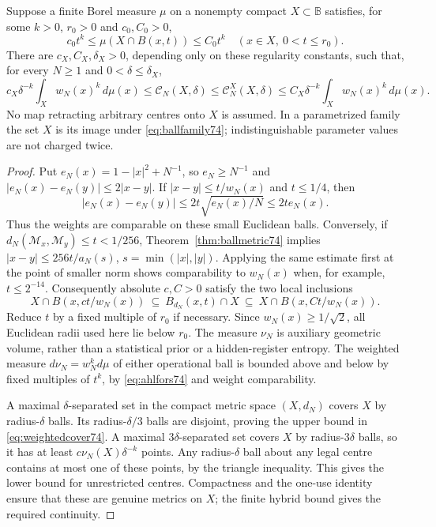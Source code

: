 \begin{theorem}\label{thm:weightedcover74}
Suppose a finite Borel measure $\mu$ on a nonempty compact
$X\subset\mathbb B$ satisfies, for some $k>0$, $r_0>0$ and $c_0,C_0>0$,
\begin{equation}\label{eq:ahlfors74}
 c_0 t^k\le\mu(X\cap B(x,t))\le C_0t^k
           \quad(x\in X,\ 0<t\le r_0).
\end{equation}
There are $c_X,C_X,\delta_X>0$, depending only on these regularity
constants, such that, for every $N\ge1$ and $0<\delta\le\delta_X$,
\begin{equation}\label{eq:weightedcover74}
 c_X\delta^{-k}\int_X w_N(x)^k\,d\mu(x)
 \le\mathcal C_N(X,\delta)
 \le\mathcal C_N^X(X,\delta)
 \le C_X\delta^{-k}\int_X w_N(x)^k\,d\mu(x).
\end{equation}
No map retracting arbitrary centres onto $X$ is assumed. In a
parametrized family the set $X$ is its image under \eqref{eq:ballfamily74};
indistinguishable parameter values are not charged twice.
\end{theorem}
\begin{proof}
Put $e_N(x)=1-|x|^2+N^{-1}$, so $e_N\ge N^{-1}$ and
$|e_N(x)-e_N(y)|\le2|x-y|$. If
$|x-y|\le t/w_N(x)$ and $t\le1/4$, then
\[
 |e_N(x)-e_N(y)|\le2t\sqrt{e_N(x)/N}\le2t e_N(x).
\]
Thus the weights are comparable on these small Euclidean balls.
Conversely, if $d_N(\mathcal M_x,\mathcal M_y)\le t<1/256$,
Theorem~\ref{thm:ballmetric74} implies
$|x-y|\le256t/a_N(s)$, $s=\min(|x|,|y|)$. Applying the same estimate
first at the point of smaller norm shows comparability to $w_N(x)$
when, for example, $t\le2^{-14}$. Consequently absolute $c,C>0$
satisfy the two local inclusions
\[
 X\cap B(x,ct/w_N(x))\ \subseteq\ B_{d_N}(x,t)\cap X
 \ \subseteq\ X\cap B(x,Ct/w_N(x)).
\]
Reduce $t$ by a fixed multiple of $r_0$ if necessary. Since
$w_N(x)\ge1/\sqrt2$, all Euclidean radii used here lie below $r_0$.
The measure $\nu_N$ is auxiliary geometric volume, rather than a
statistical prior or a hidden-register entropy. The weighted measure
$d\nu_N=w_N^k d\mu$ of either operational ball
is bounded above and below by fixed multiples of $t^k$, by
\eqref{eq:ahlfors74} and weight comparability.

A maximal $\delta$-separated set in the compact metric space
$(X,d_N)$ covers $X$ by radius-$\delta$ balls. Its radius-$\delta/3$
balls are disjoint, proving the upper bound in
\eqref{eq:weightedcover74}. A maximal $3\delta$-separated set covers
$X$ by radius-$3\delta$ balls, so it has at least
$c\nu_N(X)\delta^{-k}$ points. Any radius-$\delta$ ball about any
legal centre contains at most one of these points, by the triangle
inequality. This gives the lower bound for unrestricted centres.
Compactness and the one-use identity ensure that these are genuine
metrics on $X$; the finite hybrid bound gives the required continuity.
\end{proof}

